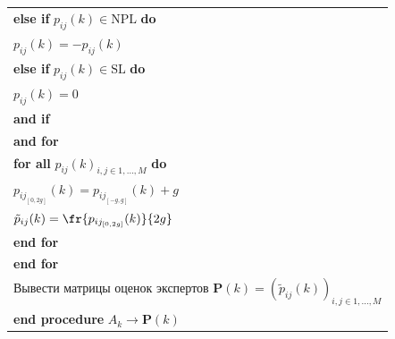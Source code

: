 \begin{enumerate}[(1)]
\begin{center}
{\begin{tabular}{l}
     \hspace*{12mm}\textbf{  else if} $p_{ij}(k)\in \mathrm{NPL}$ \textbf{do}\\


  \hspace*{13mm}$p_{ij}(k) =-p_{ij}(k)$\\


  \hspace*{12mm}\textbf{else if} $p_{ij}(k)\in \mathrm{SL}$ \textbf{do}\\


        \hspace*{13mm}$p_{ij}(k)=0$\\


    \hspace*{12mm}\textbf{and if}\\


    \hspace*{8mm}\textbf{and for}\\


    \hspace*{8mm}\textbf{for all} $p_{ij}(k)_{i,j\in 1,\ldots , M}$ \textbf{do}\\


       \hspace*{10mm}$p_{ij_{[0,2g]}} (k)=p_{ij_{[-g,g]}}(k)+g$\\


  \hspace*{10mm}$\displaystyle \tilde{p}_{ij}(k)=\fr{p_{ij_{[0,2g]}}(k)}{2g}$\\


    \hspace*{8mm}\textbf{end for}\\


         \hspace*{6mm}\textbf{end for}\\


       \hspace*{4mm}Вывести матрицы оценок экспертов $\mathbf{P}(k)=\left( 


\tilde{p}_{ij}(k)\right)_{i,j\in 1,\ldots , M}$\\


    \hspace*{4mm}\textbf{end procedure} $A_k\to \mathbf{P}(k)$\\


  \hline


  \end{tabular}


  }



\end{center}
\end{enumerate}
